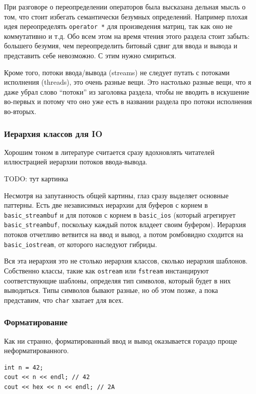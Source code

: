 \documentclass[a4paper,12pt,oneside]{article}
\begin{document}
При разговоре о переопределении операторов была высказана дельная мысль о том, что стоит избегать семантически безумных определений. Например плохая идея переопределять \lstinline!operator *! для произведения матриц, так как оно не коммутативно и т.д. Обо всем этом на время чтения этого раздела стоит забыть: большего безумия, чем переопределить битовый сдвиг для ввода и вывода и представить себе невозможно. С этим нужно смириться.

Кроме того, потоки ввода/вывода (streams) не следует путать с потоками исполнения (threads), это очень разные вещи. Это настолько разные вещи, что я даже убрал слово ``потоки'' из заголовка раздела, чтобы не вводить в искушение во-первых и потому что оно уже есть в названии раздела про потоки исполнения во-вторых.

\subsubsection{Иерархия классов для IO}

Хорошим тоном в литературе считается сразу вдохновлять читателей иллюстрацией иерархии потоков ввода-вывода.

TODO: тут картинка

Несмотря на запутанность общей картины, глаз сразу выделяет основные паттерны. Есть две независимых иерархии для буферов с корнем в \lstinline!basic_streambuf! и для потоков с корнем в \lstinline!basic_ios! (который агрегирует \lstinline!basic_streambuf!, поскольку каждый поток владеет своим буфером). Иерархия потоков отчетливо ветвится на ввод и вывод, а потом ромбовидно сходится на \lstinline!basic_iostream!, от которого наследуют гибриды.

Вся эта иерархия это не столько иерархия классов, сколько иерархия шаблонов. Собственно классы, такие как \lstinline!ostream! или \lstinline!fstream! инстанцируют соответствующие шаблоны, определяя тип символов, который будет в них выводиться. Типы символов бывают разные, но об этом позже, а пока представим, что \lstinline!char! хватает для всех.

\subsubsection{Форматирование}\label{FormattedIO}

Как ни странно, форматированный ввод и вывод оказывается гораздо проще неформатированного.

\begin{lstlisting}
int n = 42;
cout << n << endl; // 42
cout << hex << n << endl; // 2A
\end{lstlisting}
\end{document}
